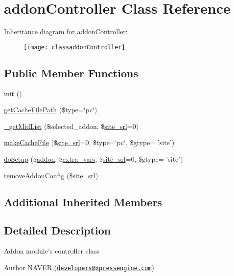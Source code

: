 \hypertarget{classaddonController}{\section{addon\+Controller Class Reference}
\label{classaddonController}
}
Inheritance diagram for addon\+Controller\+:\begin{figure}[H]
\begin{center}
\leavevmode
\texttt{[image: classaddonController]}
\end{center}
\end{figure}
\subsection*{Public Member Functions}
\begin{DoxyCompactItemize}
\item 
\hyperlink{classaddonController_a11ede7aecba420c2a5c7e55d8bab4013}{init} ()
\item 
\hyperlink{classaddonController_aaad3343ec8471cab540db6ebde4c06bd}{get\+Cache\+File\+Path} (\$type=\char`\"{}pc\char`\"{})
\item 
\hyperlink{classaddonController_a7a1ed742a1dd2c4f71e56acafe31c13d}{\+\_\+get\+Mid\+List} (\$selected\+\_\+addon, \$\hyperlink{ko_8install_8php_a8b1406b4ad1048041558dce6bfe89004}{site\+\_\+srl}=0)
\item 
\hyperlink{classaddonController_ad0f567db4f461bb5d2d6449b38f261ed}{make\+Cache\+File} (\$\hyperlink{ko_8install_8php_a8b1406b4ad1048041558dce6bfe89004}{site\+\_\+srl}=0, \$type=\char`\"{}pc\char`\"{}, \$gtype= 'site')
\item 
\hyperlink{classaddonController_a029f47b2dc77ada00e12e6323039ebdb}{do\+Setup} (\$\hyperlink{classaddon}{addon}, \$\hyperlink{ko_8install_8php_ae1dcb37fc34a8f312d2e6abd6f806743}{extra\+\_\+vars}, \$\hyperlink{ko_8install_8php_a8b1406b4ad1048041558dce6bfe89004}{site\+\_\+srl}=0, \$gtype= 'site')
\item 
\hyperlink{classaddonController_ad90c76bfd8351152d3d69b287c606fe5}{remove\+Addon\+Config} (\$\hyperlink{ko_8install_8php_a8b1406b4ad1048041558dce6bfe89004}{site\+\_\+srl})
\end{DoxyCompactItemize}
\subsection*{Additional Inherited Members}


\subsection{Detailed Description}
Addon module's controller class \begin{DoxyAuthor}{Author}
N\+A\+V\+E\+R (\href{mailto:developers@xpressengine.com}{\tt developers@xpressengine.\+com}) 
\end{DoxyAuthor}


